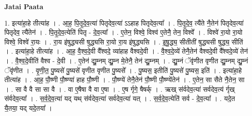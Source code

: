 \documentclass[17pt]{extarticle}
\begin{document}
\textbf{Jatai Paata} \newline

1. इत्या॑हा॒हे तीत्या॑ह । . आ॒ह॒ पि॒तृ॒दे॒व॒त्या॑ पितृदेव॒त्या॑ ऽऽहाह पितृदेव॒त्या᳚ । . पि॒तृ॒दे॒व॒ त्यै॑ते नै॒तेन॑ पितृदेव॒त्या॑ पितृदेव॒ त्यै॑तेन॑ । . पि॒तृ॒दे॒व॒त्येति॑ पितृ - दे॒व॒त्या᳚ । . ए॒तेन॒ विश्वे॒ विश्व॑ ए॒तेनै॒ तेन॒ विश्वे᳚ । . विश्वे॑ रा॒यो रा॒यो विश्वे॒ विश्वे॑ रा॒यः । . रा॒य इ॑षुद्ध्यसी षुद्ध्यसि रा॒यो रा॒य इ॑षुद्ध्यसि । . इ॒षु॒द्ध्य॒ सीतीती॑ षुद्ध्यसी षुद्ध्य॒ सीति॑ । . इत्या॑हा॒हे तीत्या॑ह । . आ॒ह॒ वै॒श्व॒दे॒वी वै᳚श्वदे॒ व्या॑हाह वैश्वदे॒वी । . वै॒श्व॒दे॒व्ये॑ तेनै॒तेन॑ वैश्वदे॒वी वै᳚श्वदे॒व्ये॑ तेन॑ । . वै॒श्व॒दे॒वीति॑ वैश्व - दे॒वी । . ए॒तेन॑ द्यु॒म्नम् द्यु॒म्न मे॒तेनै॒ तेन॑ द्यु॒म्नम् । . द्यु॒म्नं ॅवृ॑णीत वृणीत द्यु॒म्नम् द्यु॒म्नं ॅवृ॑णीत । . वृ॒णी॒त॒ पु॒ष्यसे॑ पु॒ष्यसे॑ वृणीत वृणीत पु॒ष्यसे᳚ । . पु॒ष्यस॒ इतीति॑ पु॒ष्यसे॑ पु॒ष्यस॒ इति॑ । . इत्या॑हा॒हे तीत्या॑ह । . आ॒ह॒ पौ॒ष्णी पौ॒ष्ण्या॑ हाह पौ॒ष्णी । . पौ॒ष्ण्ये॑ तेनै॒तेन॑ पौ॒ष्णी पौ॒ष्ण्ये॑तेन॑ । . ए॒तेन॒ सा सैते नै॒तेन॒ सा । . सा वै वै सा सा वै । . वा ए॒षैषा वै वा ए॒षा । . ए॒ष र्गृगे॒ षैषर्क् । . ऋख् स॑र्वदेव॒त्या॑ सर्वदेव॒त्य॑ र्गृख् स॑र्वदेव॒त्या᳚ । . स॒र्व॒दे॒व॒त्या॑ यद् यथ् स॑र्वदेव॒त्या॑ सर्वदेव॒त्या॑ यत् । . स॒र्व॒दे॒व॒त्येति॑ सर्व - दे॒व॒त्या᳚ । . यदे॒त यै॒तया॒ यद् यदे॒तया᳚ । \newline
\end{document}
